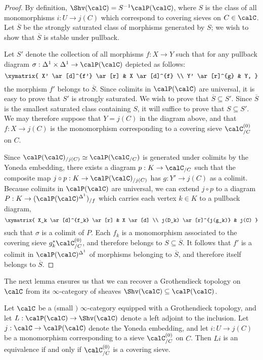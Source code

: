 \begin{proof}
By definition, $\Shv(\calC) = S^{-1} \calP(\calC)$, where $S$ is the class of all monomorphisms 
$i: U \rightarrow j(C)$ which correspond to covering sieves on $C \in \calC$. Let $\overline{S}$ be the strongly saturated class of morphisms generated by $S$; we wish to show that $\overline{S}$ is stable under pullback.

Let $S'$ denote the collection of all morphisms $f: X \rightarrow Y$ such that for any
pullback diagram $\sigma: \Delta^1 \times \Delta^1 \rightarrow \calP(\calC)$ depicted as follows:
$$ \xymatrix{ X' \ar[d]^{f'} \ar[r] & X \ar[d]^{f} \\
Y' \ar[r]^{g} & Y, }$$
the morphism $f'$ belongs to $\overline{S}$. Since colimits in $\calP(\calC)$ are universal, it is easy to prove that $S'$ is strongly saturated. We wish to prove that $\overline{S} \subseteq S'$. Since $\overline{S}$ is the smallest saturated class containing $S$, it will suffice to prove that $S \subseteq S'$. We may therefore suppose that $Y = j(C)$ in the diagram above, and that $f: X \rightarrow j(C)$ is the monomorphism corresponding to a covering sieve
$\calC^{(0)}_{/C}$ on $C$. 

Since $\calP(\calC)_{/j(C)} \simeq \calP(\calC_{/C})$ is generated under colimits by the Yoneda embedding, there exists a diagram $p: K \rightarrow \calC_{/C}$ such that the composite
map $j \circ p: K \rightarrow \calP(\calC)_{/j(C)}$ has $g: Y' \rightarrow j(C)$ as a colimit.
Because colimits in $\calP(\calC)$ are universal, we can extend $j \circ p$ to a 
diagram $P: K \rightarrow (\calP(\calC)^{\Delta^1})_{/f}$ which carries each vertex 
$k \in K$ to a pullback diagram,
$$ \xymatrix{ X_k \ar[d]^{f_k} \ar[r] & X \ar[d] \\
j(D_k) \ar[r]^{j(g_k)} & j(C) }$$
such that $\sigma$ is a colimit of $P$. Each $f_k$ is a monomorphism associated to the
covering sieve $g_k^{\ast} \calC^{(0)}_{/C}$, and therefore belongs to $S \subseteq \overline{S}$. It follows that $f'$ is a colimit in $\calP(\calC)^{\Delta^1}$ of morphisms belonging to $\overline{S}$, and therefore itself belongs to $\overline{S}$.
\end{proof}

The next lemma ensures us that we can recover a Grothendieck topology on $\calC$ from
its $\infty$-category of sheaves $\Shv(\calC) \subseteq \calP(\calC)$.

\begin{lemma}\label{recloose}
Let $\calC$ be a $($small $)$ $\infty$-category equipped with a Grothendieck topology, and
let $L: \calP(\calC) \rightarrow \Shv(\calC)$ denote a left adjoint to the inclusion. Let
$j: \calC \rightarrow \calP(\calC)$ denote the Yoneda embedding, and let
$i: U \rightarrow j(C)$ be a monomorphism corresponding to a sieve $\calC^{(0)}_{/C}$
on $C$. Then $Li$ is an equivalence if and only if
$\calC^{(0)}_{/C}$ is a covering sieve.
\end{lemma}

